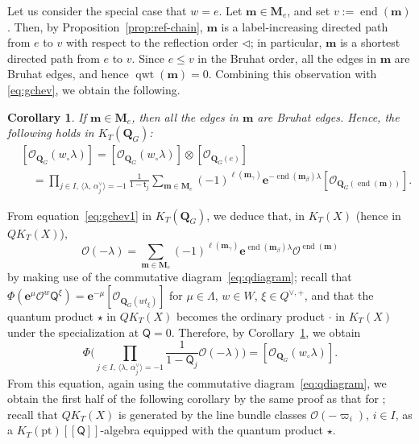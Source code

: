 \documentclass[11pt,a4paper,reqno,dvipdfmx]{amsart}
\numberwithin{equation}{section}
\newcommand{\CO}{\mathcal{O}}
\newcommand{\sQ}{\mathsf{Q}}
\newcommand{\st}{\mathsf{t}}
\newcommand{\be}{\mathbf{e}}
\newcommand{\bm}{\mathbf{m}}
\newcommand{\bM}{\mathbf{M}}
\DeclareMathOperator{\qwt}{qwt}
\DeclareMathOperator{\ed}{end}
\newcommand{\pt}{\mathrm{pt}}
\newcommand{\lng}{w_{\circ}}
\newcommand{\pair}[2]{\langle #1,\,#2 \rangle}
\newcommand{\bra}[1]{[\![#1]\!]}
\newcommand{\QG}{\mathbf{Q}_{G}}
\newcommand{\LQG}[1]{[\CO_{\QG}(#1)]}
\newcommand{\SQG}[1]{[\CO_{\QG(#1)}]}
\theoremstyle{plain}
\newtheorem{cor}[lem]{Corollary}
\theoremstyle{definition}
\theoremstyle{remark}
\begin{document}
Let us consider the special case that $w = e$. 
Let $\bm \in \bM_{e}$, and set $v:=\ed(\bm)$. 
Then, by Proposition~\ref{prop:ref-chain}, 
$\bm$ is a label-increasing directed path from $e$ to $v$ 
with respect to the reflection order $\lhd$; 
in particular, $\bm$ is a shortest directed path from $e$ to $v$. 
Since $e \le v$ in the Bruhat order, all the edges in $\bm$ are 
Bruhat edges, and hence $\qwt(\bm)=0$. Combining this observation with \eqref{eq:gchev}, 
we obtain the following. 
%
%
\begin{cor} \label{cor:gc1}
If $\bm \in \bM_{e}$, then all the edges in $\bm$ are Bruhat edges. 
Hence, the following holds in $K_{T}(\QG)${\rm :} 
%
\begin{align}
& \LQG{\lng \lambda} = \LQG{\lng \lambda} \otimes \SQG{e} \nonumber \\[3mm]
& \quad = \prod_{ j \in I,\,
  \pair{\lambda}{\alpha_{j}^{\vee}} = - 1 }
  \frac{1}{1-\st_{j}} \sum_{\bm \in \bM_{e}}
  (-1)^{\ell(\bm_{\gamma})} \be^{ - \ed(\bm_{\beta}) \lambda }
  \SQG{ \ed(\bm) }. \label{eq:gchev1}
\end{align}
%
\end{cor}
%
From equation~\eqref{eq:gchev1} in $K_{T}(\QG)$, 
we deduce that, in $K_{T}(X)$ (hence in $QK_{T}(X)$), 
%
\begin{equation} \label{eq:gchev2}
\CO(- \lambda) = \sum_{\bm \in \bM_{e}}
  (-1)^{\ell(\bm_{\gamma})} \be^{ \ed(\bm_{\beta}) \lambda }
  \CO^{ \ed(\bm) } 
\end{equation}
%
%
by making use of the commutative diagram~\eqref{eq:qdiagram}; 
recall that $\Phi(\be^{\mu}\CO^{w}\sQ^{\xi}) = \be^{-\mu}\SQG{ wt_{\xi} }$ 
for $\mu \in \Lambda$, $w \in W$, $\xi \in Q^{\vee,+}$, and that 
the quantum product $\star$ in $QK_{T}(X)$ becomes 
the ordinary product $\cdot$ in $K_{T}(X)$ under the specialization at $\sQ = 0$. 
Therefore, by Corollary~\ref{cor:gc1}, we obtain 
%
\begin{equation}
\Phi \biggl( \prod_{ j \in I,\,
  \pair{\lambda}{\alpha_{j}^{\vee}} = - 1 }
\frac{1}{1-\sQ_{j}} \CO(- \lambda) \biggr) = \LQG{\lng \lambda}.
\end{equation}
%
From this equation, again using the commutative diagram~\eqref{eq:qdiagram}, 
we obtain the first half of the following corollary 
by the same proof as that for \cite[Proposition~5.1]{MNS}; recall that $QK_{T}(X)$ is 
generated by the line bundle classes $\CO(- \varpi_i)$, $i \in I$, 
as a $K_{T}(\pt)\bra{\sQ}$-algebra equipped with the quantum product $\star$. 
\end{document}

